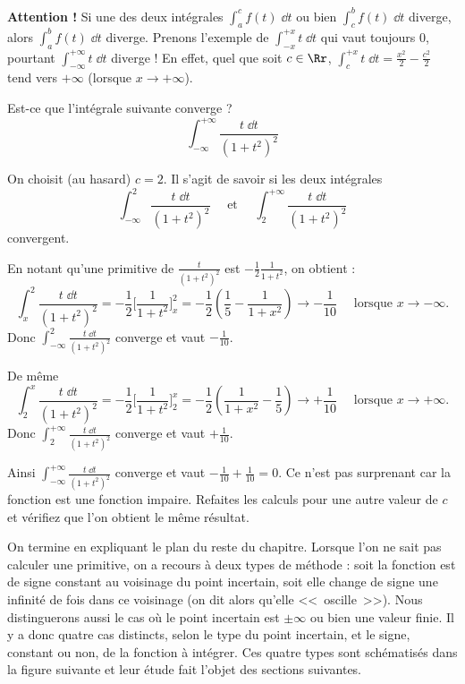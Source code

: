 \documentclass[class=report,crop=false]{standalone}
\begin{document}
\medskip

\textbf{Attention !}
Si une des deux intégrales $\int_a^c f(t)\;\dd t$ ou bien
$\int_c^b f(t)\;\dd t$ diverge, alors $\int_a^b f(t)\;\dd t$ diverge.
Prenons l'exemple de $\int_{-x}^{+x} t\;\dd t$ qui vaut toujours $0$,
pourtant $\int_{-\infty}^{+\infty}t\;\dd t$ diverge ! En effet, quel que soit 
$c\in \Rr$, $\int_{c}^{+x} t\;\dd t = \frac{x^2}{2}-\frac{c^2}{2}$ tend vers $+\infty$
(lorsque $x\to+\infty$).


\begin{exemple}
Est-ce que l'intégrale suivante converge ?
$$\int_{-\infty}^{+\infty} \frac{t \;\dd t}{(1+t^2)^2}$$

On choisit (au hasard) $c=2$. Il s'agit de savoir si les deux intégrales
$$\int_{-\infty}^{2} \frac{t \;\dd t}{(1+t^2)^2} \quad \text{ et } \quad 
\int_{2}^{+\infty} \frac{t \;\dd t}{(1+t^2)^2}$$
convergent.

En notant qu'une primitive de $\frac{t}{(1+t^2)^2}$ est $-\frac12\frac{1}{1+t^2}$, on obtient :
$$\int_{x}^{2} \frac{t \;\dd t}{(1+t^2)^2}
= -\frac12 \Big[ \frac{1}{1+t^2}\Big]_{x}^{2}
= -\frac12 \left(\frac15 - \frac{1}{1+x^2}\right)
\to -\frac{1}{10} \quad \text{ lorsque } x \to -\infty.$$
Donc $\int_{-\infty}^{2} \frac{t \;\dd t}{(1+t^2)^2}$ converge et vaut $-\frac{1}{10}$.

De même $$\int_{2}^{x} \frac{t \;\dd t}{(1+t^2)^2}
= -\frac12 \Big[ \frac{1}{1+t^2}\Big]_{2}^{x}
= -\frac12 \left(\frac{1}{1+x^2}-\frac15\right)
\to +\frac{1}{10} \quad \text{ lorsque } x \to +\infty.$$
Donc $\int_{2}^{+\infty} \frac{t \;\dd t}{(1+t^2)^2}$ converge et vaut $+\frac{1}{10}$.


Ainsi $\int_{-\infty}^{+\infty} \frac{t \;\dd t}{(1+t^2)^2}$ converge et vaut
$-\frac{1}{10}+\frac{1}{10} = 0$. Ce n'est pas surprenant car la fonction est une fonction impaire.
Refaites les calculs pour une autre valeur de $c$ 
et vérifiez que l'on obtient le même résultat.

\end{exemple}

\bigskip
\bigskip
\bigskip

On termine en expliquant le plan du reste du chapitre.
Lorsque l'on ne sait pas calculer une primitive, on a
recours à deux types de méthode : soit la fonction est de signe constant
au voisinage du point incertain, soit elle change de signe une infinité de fois
dans ce voisinage (on dit alors qu'elle <<~oscille~>>).
Nous distinguerons aussi le cas où le point incertain est $\pm \infty$
ou bien une valeur finie.
Il y a donc quatre cas distincts, selon le type du point incertain, et le signe, constant ou
non, de la fonction à intégrer. Ces quatre types sont schématisés
dans la figure suivante et leur étude fait l'objet des sections suivantes. 
\end{document}
